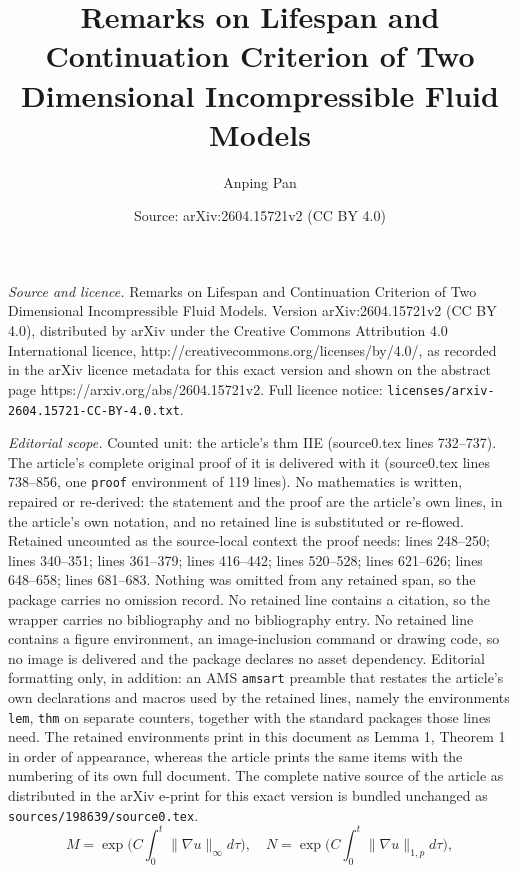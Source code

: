 \documentclass[10pt,a4paper]{amsart}
\title{Remarks on Lifespan and Continuation Criterion of Two Dimensional Incompressible Fluid Models}
\author{Anping Pan}
\date{Source: arXiv:2604.15721v2 (CC BY 4.0)}
\begin{document}
\maketitle

\noindent\emph{Source and licence.} Remarks on Lifespan and Continuation Criterion of Two Dimensional Incompressible Fluid Models. Version arXiv:2604.15721v2 (CC BY 4.0), distributed by arXiv under the Creative Commons Attribution 4.0 International licence, http://creativecommons.org/licenses/by/4.0/, as recorded in the arXiv licence metadata for this exact version and shown on the abstract page https://arxiv.org/abs/2604.15721v2. Full licence notice: \texttt{licenses/arxiv-2604.15721-CC-BY-4.0.txt}.\par\smallskip

\noindent\textit{Editorial scope.} Counted unit: the article's thm IIE (source0.tex lines 732--737). The article's complete original proof of it is delivered with it (source0.tex lines 738--856, one \texttt{proof} environment of 119 lines). No mathematics is written, repaired or re-derived: the statement and the proof are the article's own lines, in the article's own notation, and no retained line is substituted or re-flowed.  Retained uncounted as the source-local context the proof needs: lines 248--250; lines 340--351; lines 361--379; lines 416--442; lines 520--528; lines 621--626; lines 648--658; lines 681--683.  Nothing was omitted from any retained span, so the package carries no omission record.  No retained line contains a citation, so the wrapper carries no bibliography and no bibliography entry.  No retained line contains a figure environment, an image-inclusion command or drawing code, so no image is delivered and the package declares no asset dependency.  Editorial formatting only, in addition: an AMS \texttt{amsart} preamble that restates the article's own declarations and macros used by the retained lines, namely the environments \texttt{lem}, \texttt{thm} on separate counters, together with the standard packages those lines need.  The retained environments print in this document as Lemma 1, Theorem 1 in order of appearance, whereas the article prints the same items with the numbering of its own full document.  The complete native source of the article as distributed in the arXiv e-print for this exact version is bundled unchanged as \texttt{sources/198639/source0.tex}.
\begin{equation}\label{Streching Variable Definition}
M=\exp\bigg(C\int_0^t \lVert\nabla u\rVert_\infty d\tau\bigg),\quad N= \exp\bigg(C\int_0^t \lVert\nabla u\rVert_{1,p} d\tau\bigg),
\end{equation}
\end{document}
